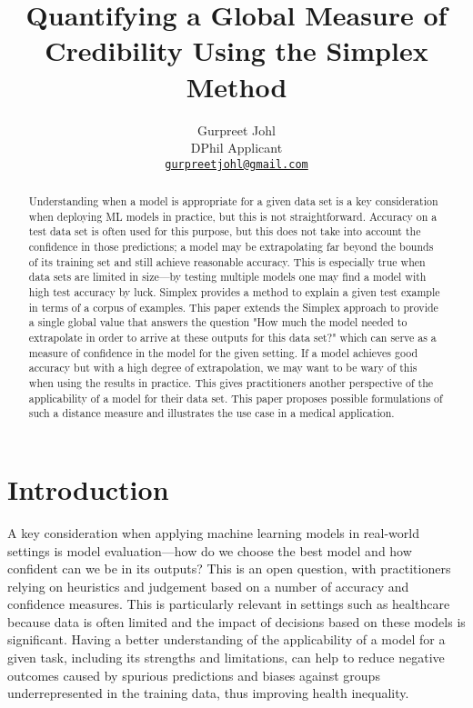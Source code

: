 \documentclass{article}
\title{Quantifying a Global Measure of Credibility Using the Simplex Method}
\author{%
  Gurpreet Johl \\
  DPhil Applicant \\
  \href{mailto:gurpreetjohl@gmail.com}{\texttt{gurpreetjohl@gmail.com}}
}
\begin{document}
\maketitle

\begin{abstract}
Understanding when a model is appropriate for a given data set is a key consideration when deploying ML models in practice, but this is not straightforward.
Accuracy on a test data set is often used for this purpose, but this does not take into account the confidence in those predictions; a model may be extrapolating far beyond the bounds of its training set and still achieve reasonable accuracy.
This is especially true when data sets are limited in size---by testing multiple models one may find a model with high test accuracy by luck.
Simplex provides a method to explain a given test example in terms of a corpus of examples. This paper extends the Simplex approach to provide a single global value that answers the question "How much the model needed to extrapolate in order to arrive at these outputs for this data set?"
which can serve as a measure of confidence in the model for the given setting.
If a model achieves good accuracy but with a high degree of extrapolation, we may want to be wary of this when using the results in practice.
This gives practitioners another perspective of the applicability of a model for their data set.
This paper proposes possible formulations of such a distance measure and illustrates the use case in a medical application.
\end{abstract}



\section{Introduction}

A key consideration when applying machine learning models in real-world settings is model evaluation---how do we choose the best model and how confident can we be in its outputs? This is an open question, with practitioners relying on heuristics and judgement based on a number of accuracy and confidence measures\cite{ding_model_2018}\cite{raschka_model_2020}.
This is particularly relevant in settings such as healthcare because data is often limited and the impact of decisions based on these models is significant. Having a better understanding of the applicability of a model for a given task, including its strengths and limitations, can help to reduce negative outcomes caused by spurious predictions and biases against groups underrepresented in the training data, thus improving health inequality.
\end{document}
